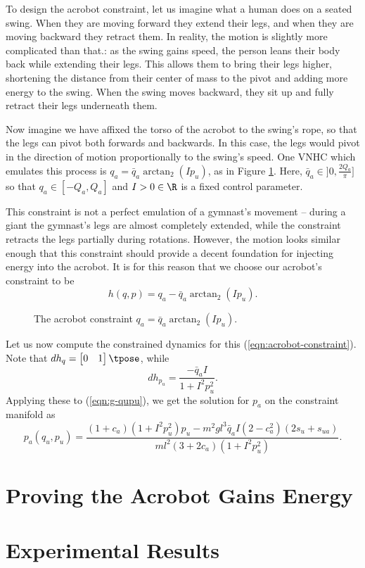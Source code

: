 To design the acrobot constraint, let us imagine what a human does on
a seated swing.
When they are moving forward they extend their legs, and when they are moving
backward they retract them. 
In reality, the motion is slightly more complicated than that.:
as the swing gains speed, the person leans their body back while
extending their legs.
This allows them to bring their legs higher, shortening the distance
from their center of mass to the pivot and adding more energy to the swing.
When the swing moves backward, they sit up and fully retract their legs
underneath them.

Now imagine we have affixed the torso of the acrobot to the swing's rope, so 
that the legs can pivot both forwards and backwards.  
In this case, the legs would pivot in the direction of motion
proportionally to the swing's speed.
One VNHC which emulates this process is \(q_a = \bar{q}_a\arctan_2( I p_u)\), as
in Figure \ref{fig:qa-arctan}.
Here, \(\bar{q}_a \in ]0,\frac{2 Q_a}{\pi}]\) so that 
\(q_a \in [-Q_a, Q_a]\) and \(I > 0 \in \R\) is a fixed control parameter.

This constraint is not a perfect emulation of a gymnast's movement -- during
a giant the gymnast's legs are almost completely extended, while the constraint
retracts the legs partially during rotations.
However, the motion looks similar enough that this constraint should provide a
decent foundation for injecting energy into the acrobot.
It is for this reason that we choose our acrobot's constraint to be
\begin{equation}\label{eqn:acrobot-constraint}
    h(q,p) = q_a - \bar{q}_a \arctan_2(I p_u)
    .
\end{equation}

\begin{figure}
    \centering
    
    \caption{The acrobot constraint \(q_a = \bar{q}_a \arctan_2(I p_u)\).}
    \label{fig:qa-arctan}
\end{figure}

Let us now compute the constrained dynamics for this
(\ref{eqn:acrobot-constraint}).
Note that \(dh_q = \begin{bmatrix}0 & 1\end{bmatrix}\tpose\), while
\[
    dh_{p_u} = \frac{-\bar{q}_a I}{1 + I^2 p_u^2}
    .
\]
Applying these to (\ref{eqn:g-qupu}), we get the solution for \(p_a\) on the
constraint manifold as
\[
    p_a(q_u,p_u) = \frac{
        (1+c_a)(1+I^2 p_u^2)p_u - m^2gl^3\bar{q}_a I (2-c_a^2)(2s_u + s_{ua})
    }{ml^2(3+2c_a)(1+I^2 p_u^2)}
    .
\]

\section{Proving the Acrobot Gains Energy}

\section{Experimental Results}

